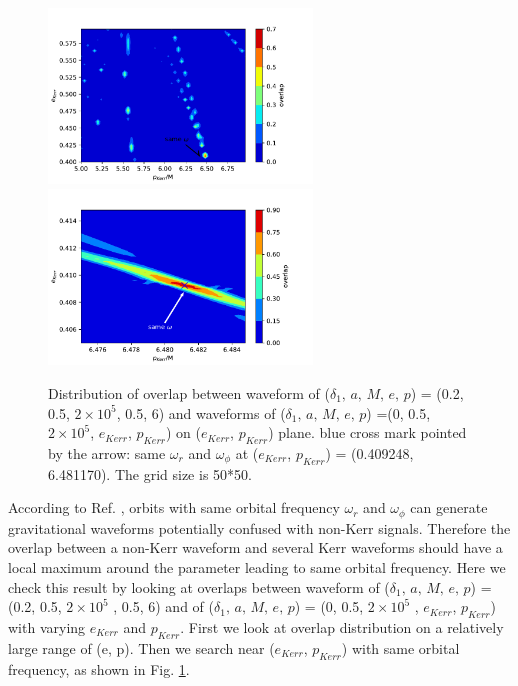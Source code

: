 \documentclass{article}
\begin{document}
\begin{figure}[htb]
	\centering
	\includegraphics[width=7cm]{OLdist.pdf}
	\includegraphics[width=7cm]{OLdist2.pdf}
	
	\caption{Distribution of overlap between waveform of ($\delta_1,\, a,\, M,\, e,\, p$) = (0.2, 0.5, $2 \times 10^5 $, 0.5, 6) and waveforms of ($\delta_1,\, a,\, M,\, e,\, p$) =(0, 0.5, $2 \times 10^5 $, $e_{Kerr}$, $p_{Kerr}$) on ($e_{Kerr}$, $p_{Kerr}$) plane. blue cross mark pointed by the arrow: same $\omega_r$ and $\omega_\phi$ at ($e_{Kerr}$, $p_{Kerr}$) = (0.409248, 6.481170).  The grid size is 50*50.}
	\label{overlapdist}
\end{figure}

According to Ref. \cite{sameOmg}, orbits with same orbital frequency $\omega_r$ and $\omega_\phi$ can generate gravitational waveforms potentially confused with non-Kerr signals. Therefore the overlap between a non-Kerr waveform and several Kerr waveforms should have a local maximum around the parameter leading to same orbital frequency. Here we check this result by looking at overlaps between waveform of ($\delta_1,\, a,\, M,\, e,\, p$) = (0.2, 0.5, $2 \times 10^5 $ , 0.5, 6) and of ($\delta_1,\, a,\, M,\, e,\, p$) = (0, 0.5, $2 \times 10^5 $ , $e_{Kerr}$, $p_{Kerr}$) with varying $e_{Kerr}$ and $p_{Kerr}$. First we look at overlap distribution on a relatively large range of (e, p). Then we search near ($e_{Kerr}$, $p_{Kerr}$) with same orbital frequency, as shown in Fig. \ref{overlapdist}. 
\end{document}
